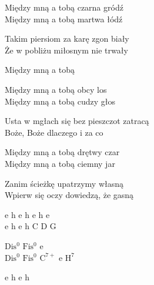 \begin{textn}
    Między mną a tobą czarna gródź\\
    Między mną a tobą martwa łódź

    Takim piersiom za karę zgon biały\\
    Że w pobliżu miłosnym nie trwały

    Między mną a tobą

    Między mną a tobą obcy los\\
    Między mną a tobą cudzy głos

    Usta w mgłach się bez pieszczot zatracą\\
    Boże, Boże dlaczego i za co

    Między mną a tobą drętwy czar\\
    Między mną a tobą ciemny jar

    Zanim ścieżkę upatrzymy własną\\
    Wpierw się oczy dowiedzą, że gasną
\end{textn}
\begin{chordw}
    e h e h e h e\\
    e h e h C D G

    $\mathrm{Dis^{0}}$ $\mathrm{Fis^{0}}$ e\\
    $\mathrm{Dis^{0}}$ $\mathrm{Fis^{0}}$ $\mathrm{C^{7+}}$ e $\mathrm{H^{7}}$

    e h e h

    \\
\end{chordw}

